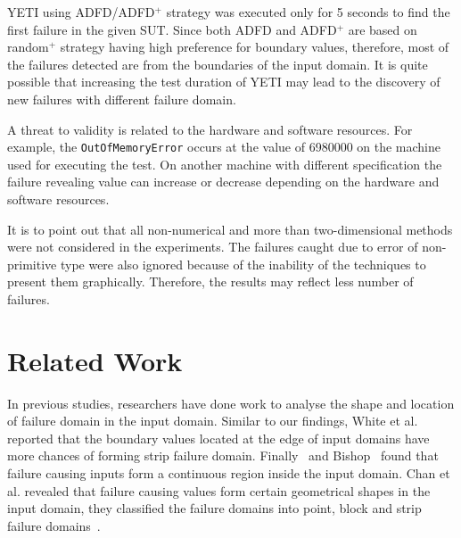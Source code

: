 YETI using ADFD/ADFD$^+$ strategy was executed only for 5 seconds to find the first failure in the given SUT. Since both ADFD and ADFD$^+$ are based on random$^+$ strategy having high preference for boundary values, therefore, most of the failures detected are from the boundaries of the input domain. It is quite possible that increasing the test duration of YETI may lead to the discovery of new failures with different failure domain.

A threat to validity is related to the hardware and software resources. For example, the \verb+OutOfMemoryError+ occurs at the value of 6980000 on the machine used for executing the test. On another machine with different specification the failure revealing value can increase or decrease depending on the hardware and software resources.

It is to point out that all non-numerical and more than two-dimensional methods were not considered in the experiments. The failures caught due to error of non-primitive type were also ignored because of the inability of the techniques to present them graphically. Therefore, the results may reflect less number of failures.












\section{Related Work}
In previous studies, researchers have done work to analyse the shape and location of failure domain in the input domain. Similar to our findings, White et al.~\cite{white1980domain} reported that the boundary values located at the edge of input domains have more chances of forming strip failure domain. Finally~\cite{finelli1991nasa} and Bishop~\cite{bishop1993variation} found that failure causing inputs form a continuous region inside the input domain. Chan et al. revealed that failure causing values form certain geometrical shapes in the input domain, they classified the failure domains into point, block and strip failure domains~\cite{chan1996proportional}. 

